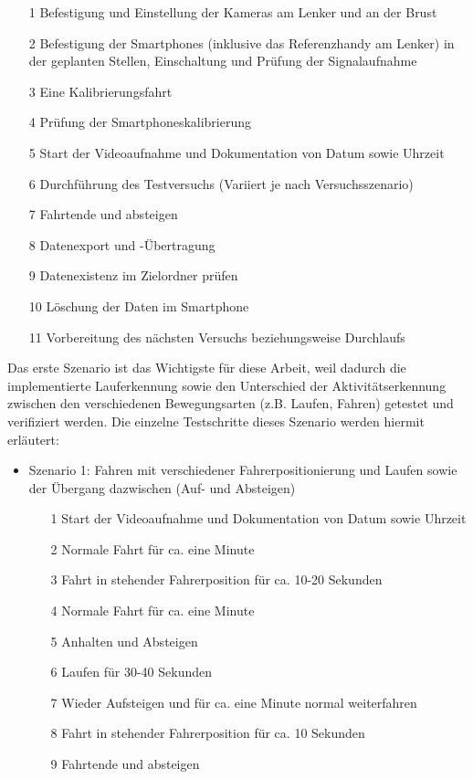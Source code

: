 \begin{itemize}
	\item[1] Befestigung und Einstellung der Kameras am Lenker und an der Brust
	\item[2] Befestigung der Smartphones (inklusive das Referenzhandy am Lenker) in der geplanten Stellen, Einschaltung und Prüfung der Signalaufnahme
	\item[3] Eine Kalibrierungsfahrt
	\item[4] Prüfung der Smartphoneskalibrierung
	\item[5] Start der Videoaufnahme und Dokumentation von Datum sowie Uhrzeit
	\item[6] Durchführung des Testversuchs (Variiert je nach Versuchsszenario)
	\item[7] Fahrtende und absteigen
	\item[8] Datenexport und -Übertragung
	\item[9] Datenexistenz im Zielordner prüfen
	\item[10] Löschung der Daten im Smartphone
	\item[11] Vorbereitung des nächsten Versuchs beziehungsweise Durchlaufs
\end{itemize}

Das erste Szenario ist das Wichtigste für diese Arbeit, weil dadurch die implementierte Lauferkennung sowie den Unterschied der Aktivitätserkennung zwischen den verschiedenen Bewegungsarten (z.B. Laufen, Fahren) getestet und verifiziert werden. Die einzelne Testschritte dieses Szenario werden hiermit erläutert:
\begin{itemize}
	\item Szenario 1: Fahren mit verschiedener Fahrerpositionierung und Laufen sowie der Übergang dazwischen (Auf- und Absteigen)
	\begin{itemize}
		\item[1] Start der Videoaufnahme und Dokumentation von Datum sowie Uhrzeit
		\item[2] Normale Fahrt für ca. eine Minute
		\item[3] Fahrt in stehender Fahrerposition für ca. 10-20 Sekunden
		\item[4] Normale Fahrt für ca. eine Minute
		\item[5] Anhalten und Absteigen
		\item[6] Laufen für 30-40 Sekunden
		\item[7] Wieder Aufsteigen und für ca. eine Minute normal weiterfahren
		\item[8] Fahrt in stehender Fahrerposition für ca. 10 Sekunden
		\item[9] Fahrtende und absteigen
	\end{itemize}
\end{itemize}























